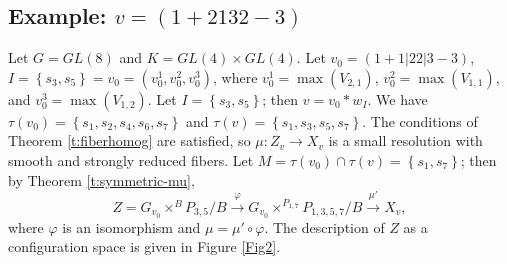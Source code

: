 \documentclass[11pt,letterpaper,reqno]{amsart}
\numberwithin{equation}{section}
\theoremstyle{plain}
\theoremstyle{definition}
\theoremstyle{remark}
\begin{document}
\subsection{Example: $v=(1+2132-3)$}
Let \(G = GL(8)\) and $K = GL(4) \times GL(4)$.  Let \(v_0=(1+1| 22 | 3-3)\), \(I=\left\{s_3,s_5\right\}   = v_0=(v_0^1, v_0^2 ,v_0^3)\), 
where \(v_0^1=\max(V_{2,1})\), \(v_0^2=\max(V_{1,1})\), and \(v_0^3=\max(V_{1,2})\).  Let $I = \left\{ s_3,s_5\right\} $; then
$v = v_0*w_I$.  
We have \(\tau(v_0)=\left\{s_1,s_2,s_4,s_6,s_7\right\}\)
and \(\tau(v)=\left\{s_1,s_3,s_5,s_7\right\}\).  The conditions of Theorem \ref{t:fiberhomog} are satisfied, so $\mu: Z_v \to X_v$ is a small resolution
with smooth and strongly reduced fibers.  Let \(M = \tau(v_0) \cap \tau(v) = \left\{s_1,s_7\right\}\); then by Theorem \ref{t:symmetric-mu},
$$
Z = G_{v_0} \times^B P_{3,5}/B \stackrel{\varphi}{\longrightarrow} G_{v_0} \times^{P_{1,7}} P_{1,3,5,7}/B \stackrel{\mu'}{\longrightarrow} X_v,
$$
where $\varphi$ is an isomorphism and $\mu = \mu' \circ \varphi$.  The description of \(Z\) as a configuration space 
is given in Figure \ref{Fig2}.
\end{document}
